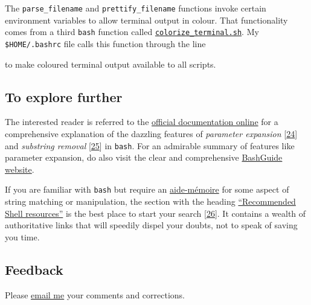 \documentclass[
  a4paper,
]{article}
\newenvironment{Shaded}{\begin{snugshade}}{\end{snugshade}}
\newcommand{\BuiltInTok}[1]{\textcolor[rgb]{0.80,0.80,0.80}{#1}}
\newcommand{\NormalTok}[1]{\textcolor[rgb]{0.80,0.80,0.80}{#1}}
\newcommand{\StringTok}[1]{\textcolor[rgb]{0.80,0.58,0.58}{#1}}
\newcommand{\VariableTok}[1]{\textcolor[rgb]{0.80,0.80,0.80}{#1}}
\begin{document}
The \texttt{parse\_filename} and \texttt{prettify\_filename} functions
invoke certain environment variables to allow terminal output in colour.
That functionality comes from a third \texttt{bash} function called
\href{scripts/colorize_terminal.sh}{\texttt{colorize\_terminal.sh}}. My
\texttt{\$HOME/.bashrc} file calls this function through the line

\begin{Shaded}
\end{Shaded}

to make coloured terminal output available to all scripts.

\hypertarget{to-explore-further}{%
\subsection{To explore further}\label{to-explore-further}}

The interested reader is referred to the
\href{https://www.gnu.org/savannah-checkouts/gnu/bash/manual/bash.html\#Shell-Parameter-Expansion}{official
documentation online} for a comprehensive explanation of the dazzling
features of \emph{parameter expansion}
{[}\protect\hyperlink{ref-shellparamexp}{24}{]} and \emph{substring
removal} {[}\protect\hyperlink{ref-wikisubstring}{25}{]} in
\texttt{bash}. For an admirable summary of features like parameter
expansion, do also visit the clear and comprehensive
\href{https://mywiki.wooledge.org/BashGuide/Parameters}{BashGuide
website}.

If you are familiar with \texttt{bash} but require an
\href{https://www.thefreedictionary.com/aide+memoire}{aide-mémoire} for
some aspect of string matching or manipulation, the section with the
heading
\href{https://wiki.bash-hackers.org/start\#recommended_shell_resources}{``Recommended
Shell resources''} is the best place to start your search
{[}\protect\hyperlink{ref-bhwstart}{26}{]}. It contains a wealth of
authoritative links that will speedily dispel your doubts, not to speak
of saving you time.

\hypertarget{feedback}{%
\subsection{Feedback}\label{feedback}}

Please \href{mailto:feedback.swanlotus@gmail.com}{email me} your
comments and corrections.
\end{document}
